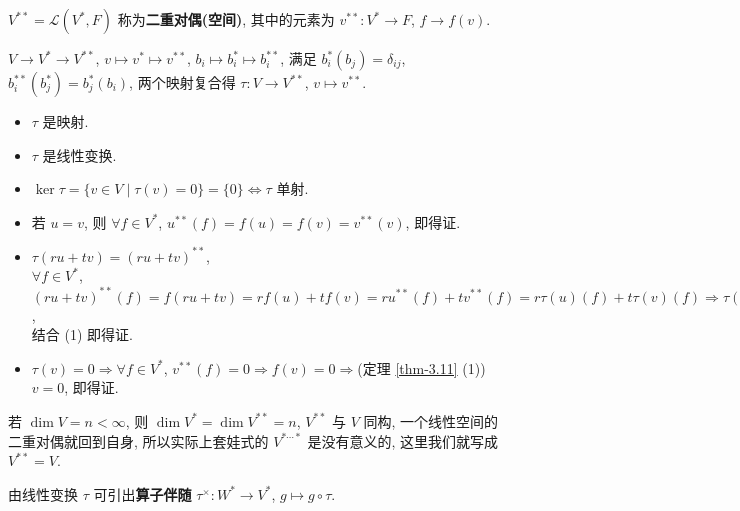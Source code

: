 \documentclass{note}
\begin{document}
\begin{df}[二重对偶(空间)]
    $V^{**}=\mathcal{L}(V^*,F)$ 称为\textbf{二重对偶(空间)}, 其中的元素为 $v^{**}:V^*\rightarrow F$, $f\rightarrow f(v)$.
\end{df}

$V\rightarrow V^*\rightarrow V^{**}$, $v\mapsto v^*\mapsto v^{**}$, $b_i\mapsto b_i^*\mapsto b_i^{**}$, 满足 $b_i^*(b_j)=\delta_{ij}$, $b_i^{**}(b_j^*)=b_j^*(b_i)$, 两个映射复合得 $\tau:V\rightarrow V^{**}$, $v\mapsto v^{**}$.

\begin{itemize}
    \item[(1)] $\tau$ 是映射.
    \item[(2)] $\tau$ 是线性变换.
    \item[(3)] $\ker\tau=\{v\in V\mid\tau(v)=0\}=\{0\}\Longleftrightarrow\tau$ 单射.
\end{itemize}
\begin{pf}
    \begin{itemize}
        \item[(1)] 若 $u=v$, 则 $\forall f\in V^*$, $u^{**}(f)=f(u)=f(v)=v^{**}(v)$, 即得证.
        \item[(2)] $\tau(ru+tv)=(ru+tv)^{**}$,\\
        $\forall f\in V^*$, $(ru+tv)^{**}(f)=f(ru+tv)=rf(u)+tf(v)=ru^{**}(f)+tv^{**}(f)=r\tau(u)(f)+t\tau(v)(f)\Longrightarrow\tau(ru+tv)=r\tau(u)+t\tau(v)$,\\
        结合 (1) 即得证.
        \item[(3)] $\tau(v)=0\Longrightarrow\forall f\in V^*$, $v^{**}(f)=0\Longrightarrow f(v)=0\Longrightarrow$(定理 \ref{thm-3.11} (1)) $v=0$, 即得证.
    \end{itemize}
\end{pf}

\begin{cor}[(课本引理 3.13)]
    若 $\dim V=n<\infty$, 则 $\dim V^*=\dim V^{**}=n$, $V^{**}$ 与 $V$ 同构, 一个线性空间的二重对偶就回到自身, 所以实际上套娃式的 $V^{*\cdots*}$ 是没有意义的, 这里我们就写成 $V^{**}=V$.
\end{cor}

\begin{df}[算子伴随]
    由线性变换 $\tau$ 可引出\textbf{算子伴随} $\tau^{\times}:W^*\rightarrow V^*$, $g\mapsto g\circ\tau$.
    \begin{center}
    \end{center}
\end{df}
\end{document}
